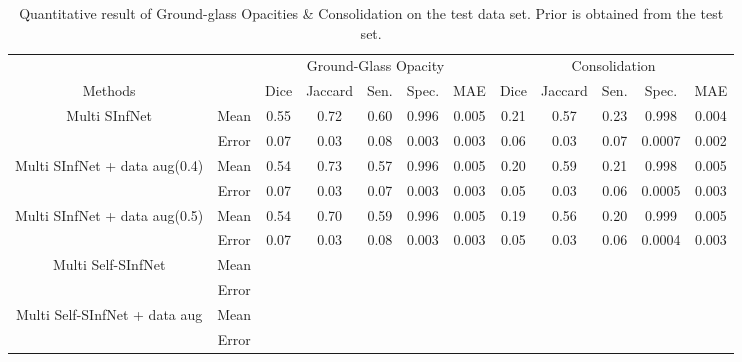 \begin{table}
	\centering
	\begin{tabular}{| c | c || c c c c c || c c c c c |}
		\hline
		& &\multicolumn{5}{c||}{Ground-Glass Opacity} & \multicolumn{5}{c|}{Consolidation}\\ \cline{3-12}
		Methods & & Dice & Jaccard & Sen. & Spec. & MAE & Dice & Jaccard & Sen. & Spec. & MAE \\\hline
		Multi SInfNet & Mean & 0.55 & 0.72 & 0.60 & 0.996 & 0.005 & 0.21 & 0.57  &0.23  &0.998  &0.004   \\ \cline{2-12}
		& Error & 0.07 & 0.03 & 0.08 & 0.003 & 0.003 & 0.06 & 0.03 & 0.07 & 0.0007 & 0.002 \\ \hline \hline
		
		Multi SInfNet + data aug(0.4) & Mean & 0.54 & 0.73 & 0.57 & 0.996 & 0.005 & 0.20 & 0.59 & 0.21 & 0.998 & 0.005  \\ \cline{2-12}
		& Error & 0.07 & 0.03 & 0.07 & 0.003 & 0.003 & 0.05 & 0.03 & 0.06 & 0.0005 & 0.003  \\ \hline \hline
		
		Multi SInfNet + data aug(0.5) & Mean & 0.54 & 0.70 & 0.59 & 0.996 & 0.005 & 0.19 & 0.56 & 0.20 & 0.999 & 0.005  \\ \cline{2-12}
		& Error & 0.07 & 0.03 & 0.08 & 0.003 & 0.003 & 0.05 & 0.03 & 0.06 & 0.0004 & 0.003  \\ \hline \hline
		
		Multi Self-SInfNet & Mean & & & & & & & & & &  \\ \cline{2-12}
		& Error & & & & & & & & & &  \\ \hline \hline
		
		Multi Self-SInfNet + data aug & Mean & & & & & & & & & &  \\ \cline{2-12}
		& Error & & & & & & & & & &  \\ \hline \hline
	\end{tabular}
	\caption{Quantitative result of Ground-glass Opacities \& Consolidation on the test data set. Prior is obtained from the test set.}
\end{table}

